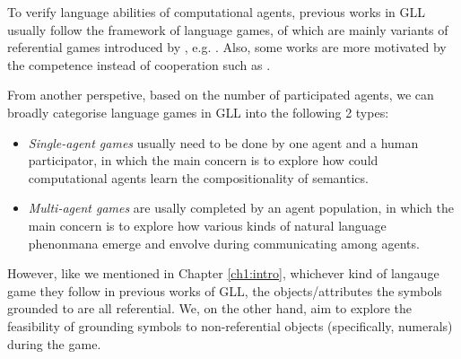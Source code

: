 To verify language abilities of computational agents, previous works in GLL usually follow the framework of language games, of which are mainly variants of referential games introduced by \cite{lewis2008convention}, e.g. \cite{hermann2017grounded, havrylov2017emergence}. Also, some works are more motivated by the competence instead of cooperation such as \cite{cao2018emergent}.

From another perspetive, based on the number of participated agents, we can broadly categorise language games in GLL into the following 2 types:
\begin{itemize}
  \item \textit{Single-agent games} usually need to be done by one agent and a human participator, in which the main concern is to explore how could computational agents learn the compositionality of semantics.
  \item \textit{Multi-agent games} are usally completed by an agent population, in which the main concern is to explore how various kinds of natural language phenonmana emerge and envolve during communicating among agents.
\end{itemize}

However, like we mentioned in Chapter \ref{ch1:intro}, whichever kind of langauge game they follow in previous works of GLL, the objects/attributes the symbols grounded to are all referential. We, on the other hand, aim to explore the feasibility of grounding symbols to non-referential objects (specifically, numerals) during the game.